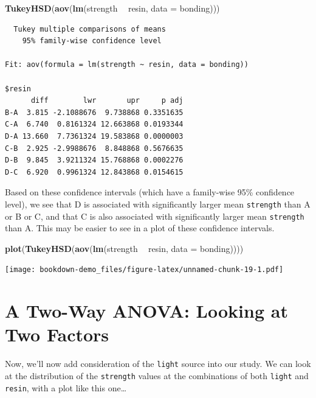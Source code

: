 \documentclass[]{book}
\newenvironment{Shaded}{\begin{snugshade}}{\end{snugshade}}
\newcommand{\KeywordTok}[1]{\textcolor[rgb]{0.13,0.29,0.53}{\textbf{#1}}}
\newcommand{\DataTypeTok}[1]{\textcolor[rgb]{0.13,0.29,0.53}{#1}}
\newcommand{\StringTok}[1]{\textcolor[rgb]{0.31,0.60,0.02}{#1}}
\newcommand{\OperatorTok}[1]{\textcolor[rgb]{0.81,0.36,0.00}{\textbf{#1}}}
\newcommand{\NormalTok}[1]{#1}
\theoremstyle{definition}
\theoremstyle{definition}
\theoremstyle{definition}
\theoremstyle{remark}
\begin{document}
\begin{Shaded}
\begin{Highlighting}[]
\KeywordTok{TukeyHSD}\NormalTok{(}\KeywordTok{aov}\NormalTok{(}\KeywordTok{lm}\NormalTok{(strength }\OperatorTok{~}\StringTok{ }\NormalTok{resin, }\DataTypeTok{data =}\NormalTok{ bonding)))}
\end{Highlighting}
\end{Shaded}

\begin{verbatim}
  Tukey multiple comparisons of means
    95% family-wise confidence level

Fit: aov(formula = lm(strength ~ resin, data = bonding))

$resin
      diff        lwr       upr     p adj
B-A  3.815 -2.1088676  9.738868 0.3351635
C-A  6.740  0.8161324 12.663868 0.0193344
D-A 13.660  7.7361324 19.583868 0.0000003
C-B  2.925 -2.9988676  8.848868 0.5676635
D-B  9.845  3.9211324 15.768868 0.0002276
D-C  6.920  0.9961324 12.843868 0.0154615
\end{verbatim}

Based on these confidence intervals (which have a family-wise 95\%
confidence level), we see that D is associated with significantly larger
mean \texttt{strength} than A or B or C, and that C is also associated
with significantly larger mean \texttt{strength} than A. This may be
easier to see in a plot of these confidence intervals.

\begin{Shaded}
\begin{Highlighting}[]
\KeywordTok{plot}\NormalTok{(}\KeywordTok{TukeyHSD}\NormalTok{(}\KeywordTok{aov}\NormalTok{(}\KeywordTok{lm}\NormalTok{(strength }\OperatorTok{~}\StringTok{ }\NormalTok{resin, }\DataTypeTok{data =}\NormalTok{ bonding))))}
\end{Highlighting}
\end{Shaded}

\texttt{[image: bookdown-demo\_files/figure-latex/unnamed-chunk-19-1.pdf]}

\section{A Two-Way ANOVA: Looking at Two
Factors}\label{a-two-way-anova-looking-at-two-factors}

Now, we'll now add consideration of the \texttt{light} source into our
study. We can look at the distribution of the \texttt{strength} values
at the combinations of both \texttt{light} and \texttt{resin}, with a
plot like this one\ldots{}
\end{document}

